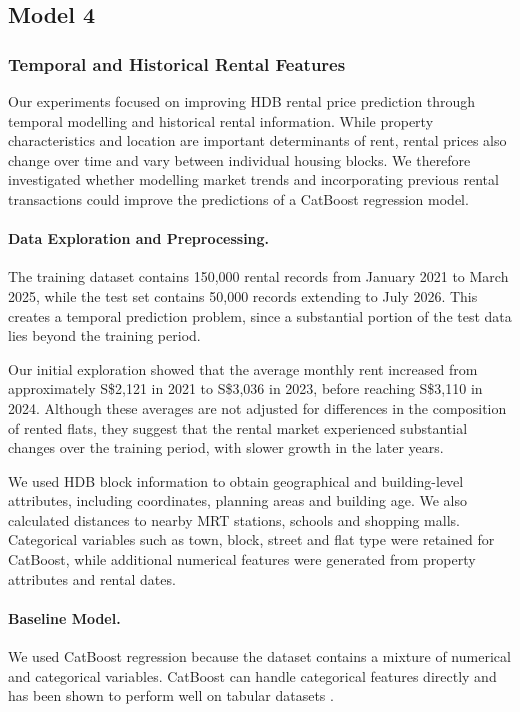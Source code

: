 \documentclass[11pt,a4paper]{article}
\begin{document}
\subsection{Model 4}

\subsubsection{Temporal and Historical Rental Features}

Our experiments focused on improving HDB rental price prediction through temporal modelling and historical rental information. While property characteristics and location are important determinants of rent, rental prices also change over time and vary between individual housing blocks. We therefore investigated whether modelling market trends and incorporating previous rental transactions could improve the predictions of a CatBoost regression model.

\paragraph{Data Exploration and Preprocessing.}
The training dataset contains 150,000 rental records from January 2021 to March 2025, while the test set contains 50,000 records extending to July 2026. This creates a temporal prediction problem, since a substantial portion of the test data lies beyond the training period.

Our initial exploration showed that the average monthly rent increased from approximately S\$2,121 in 2021 to S\$3,036 in 2023, before reaching S\$3,110 in 2024. Although these averages are not adjusted for differences in the composition of rented flats, they suggest that the rental market experienced substantial changes over the training period, with slower growth in the later years.

We used HDB block information to obtain geographical and building-level attributes, including coordinates, planning areas and building age. We also calculated distances to nearby MRT stations, schools and shopping malls. Categorical variables such as town, block, street and flat type were retained for CatBoost, while additional numerical features were generated from property attributes and rental dates.

\paragraph{Baseline Model.}
We used CatBoost regression because the dataset contains a mixture of numerical and categorical variables. CatBoost can handle categorical features directly and has been shown to perform well on tabular datasets \cite{prokhorenkova2018catboost}.
\end{document}
